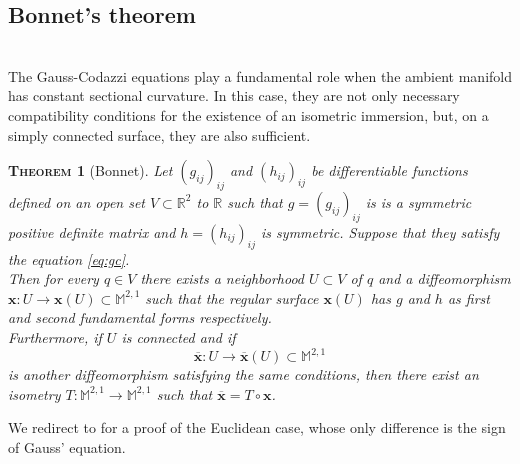 \documentclass[a4paper,11pt,openright,twoside]{book}
\newcommand{\R}{\mathbb{R}}
\newcommand{\M}{\mathbb{M}^{2,1}}
\newcommand{\1}{\mathds{1}}
\theoremstyle{plain}
\newtheorem{thm}{\textsc{Theorem}}[chapter]
\theoremstyle{definition}
\theoremstyle{remark}
\begin{document}
\subsection{Bonnet's theorem}\mbox{}\\
The Gauss-Codazzi equations play a fundamental role when the ambient manifold has constant sectional curvature. In this case, they are not only necessary compatibility conditions for the existence of an isometric immersion, but, on a simply connected surface, they are also sufficient.
\begin{thm}[Bonnet]\label{th:bonnet}
	Let $(g_{ij})_{ij}$	and $(h_{ij})_{ij}$ be differentiable functions defined on an open set $V\subset \R^2$ to $\R$ such that $g = (g_{ij})_{ij}$ is is a symmetric positive definite matrix and $h = (h_{ij})_{ij}$ is symmetric. Suppose that they satisfy the equation \eqref{eq:gc}.\\
	Then for every $q\in V$ there exists a neighborhood $U\subset V$ of $q$ and a diffeomorphism $\mathbf{x}:U\to \mathbf{x}(U) \subset \M$ such that the regular surface $\mathbf{x}(U)$ has $g$ and $h$ as first and second fundamental forms respectively.\\
	Furthermore, if $U$ is connected and if 
	\[\overline{\mathbf{x}} :U\to  \overline{\mathbf{x}}(U) \subset \M\] 
	 is another diffeomorphism satisfying the same conditions, then there exist an isometry $T:\M\to \M$ such that $\overline{\mathbf{x}} = T \circ \mathbf{x}$.
\end{thm}
We redirect to \cite{do_carmo_2016} for a proof of the Euclidean case, whose only difference is the sign of Gauss' equation.
\end{document}
